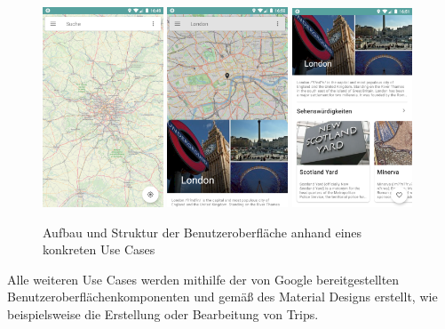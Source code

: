 			\begin{figure}[ht!]
				\includegraphics[width=0.32\textwidth]{images/travlyn-screenshot-main.png}
				\includegraphics[width=0.32\textwidth]{images/travlyn-screenshot-search-result.png}
				\includegraphics[width=0.32\textwidth]{images/travlyn-screenshot-city-detail.png}
				\caption{Aufbau und Struktur der Benutzeroberfläche anhand eines konkreten Use Cases}
				\label{fig:ui_screenshot}
			\end{figure} 
		
			Alle weiteren Use Cases werden mithilfe der von Google bereitgestellten Benutzeroberflächenkomponenten  und gemäß des Material Designs erstellt, wie beispielsweise die Erstellung oder Bearbeitung von Trips. 
		
